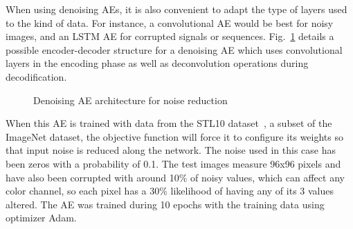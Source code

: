 When using denoising AEs, it is also convenient to adapt the type of layers used to the kind of data. For instance, a convolutional AE would be best for noisy images, and an LSTM AE for corrupted signals or sequences. Fig.~\ref{p5fig:graph-denoising} details a possible encoder-decoder structure for a denoising AE which uses convolutional layers in the encoding phase as well as deconvolution operations during decodification.

\begin{figure}[ht]
    \centering\small
    \caption{Denoising AE architecture for noise reduction}
    \label{p5fig:graph-denoising}
\end{figure}

When this AE is trained with data from the STL10 dataset~\cite{stl10}, a subset of the ImageNet dataset, the objective function will force it to configure its weights so that input noise is reduced along the network. The noise used in this case has been zeros with a probability of 0.1. The test images measure 96x96 pixels and have also been corrupted with around 10\% of noisy values, which can affect any color channel, so each pixel has a 30\% likelihood of having any of its 3 values altered. The AE was trained during 10 epochs with the training data using optimizer Adam. 

